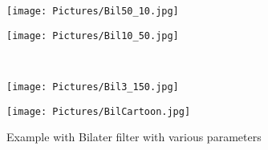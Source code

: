 \documentclass[11pt,a4paper]{article}
\begin{document}
  \begin{figure}[htbp]
    \centering
    \begin{minipage}{0.5\textwidth}
      \centering
    \texttt{[image: Pictures/Bil50\_10.jpg]}
    \end{minipage}%
    \begin{minipage}{0.5\textwidth}
      \centering
    \texttt{[image: Pictures/Bil10\_50.jpg]}
    \end{minipage}\\

\begin{minipage}{0.5\textwidth}
  \centering
\texttt{[image: Pictures/Bil3\_150.jpg]}
\end{minipage}%
    \begin{minipage}{0.5\textwidth}
      \centering
    \texttt{[image: Pictures/BilCartoon.jpg]}
    \label{fig:cartoon}
      \end{minipage}
    \caption{Example with Bilater filter with various parameters}
    \end{figure} 
\end{document}
